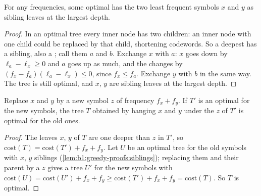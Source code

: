 \label{lst:b1:greedy-proofs:decode}

\label{out:b1:greedy-proofs:decode}

\begin{lemma}\label{lem:b1:greedy-proofs:siblings}
For any frequencies, some optimal  has the two least frequent symbols $x$ and $y$ as sibling leaves at the
largest depth.
\end{lemma}

\begin{proof}
In an optimal tree every inner node has two children: an inner node with one child could be replaced by that child,
shortening codewords. So a deepest  has a sibling, also a ; call them $a$ and $b$. Exchange $x$ with $a$: $x$ goes
down by $\ell_a - \ell_x \geq 0$ and $a$ goes up as much, and the  changes by $(f_x - f_a)(\ell_a - \ell_x) \leq 0$,
since $f_x \leq f_a$. Exchange $y$ with $b$ in the same way. The tree is still optimal, and $x$, $y$ are sibling leaves
at the largest depth.
\end{proof}

\begin{lemma}\label{lem:b1:greedy-proofs:merge}
Replace $x$ and $y$ by a new symbol $z$ of frequency $f_x + f_y$. If $T'$ is an optimal  for the new symbols,
the tree $T$ obtained by hanging $x$ and $y$ under the  $z$ of $T'$ is optimal for the old ones.
\end{lemma}

\begin{proof}
The leaves $x$, $y$ of $T$ are one deeper than $z$ in $T'$, so $\mathrm{cost}(T) = \mathrm{cost}(T') + f_x + f_y$. Let
$U$ be an optimal tree for the old symbols with $x$, $y$ siblings (\cref{lem:b1:greedy-proofs:siblings}); replacing them
and their parent by a  $z$ gives a tree $U'$ for the new symbols with $\mathrm{cost}(U) = \mathrm{cost}(U') + f_x +
f_y \geq \mathrm{cost}(T') + f_x + f_y = \mathrm{cost}(T)$. So $T$ is optimal.
\end{proof}


